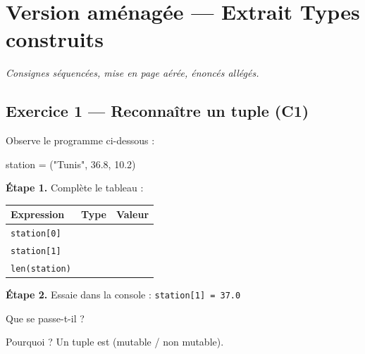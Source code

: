 \section*{Version aménagée --- Extrait Types construits}
\textit{Consignes séquencées, mise en page aérée, énoncés allégés.}

\bigskip

\subsection*{Exercice 1 --- Reconnaître un tuple (C1)}

Observe le programme ci-dessous :

\begin{python}
station = ("Tunis", 36.8, 10.2)
\end{python}

\bigskip

\textbf{Étape 1.} Complète le tableau :

\bigskip

\begin{center}
\begin{tabular}{|l|c|c|}
\hline
\textbf{Expression} & \textbf{Type} & \textbf{Valeur} \\
\hline
\texttt{station[0]} & \dotfill & \dotfill \\
\hline
\texttt{station[1]} & \dotfill & \dotfill \\
\hline
\texttt{len(station)} & \dotfill & \dotfill \\
\hline
\end{tabular}
\end{center}

\bigskip

\textbf{Étape 2.} Essaie dans la console : \lstinline{station[1] = 37.0}

\medskip
Que se passe-t-il ? \dotfill

\medskip
Pourquoi ? Un tuple est \dotfill (mutable / non mutable).


